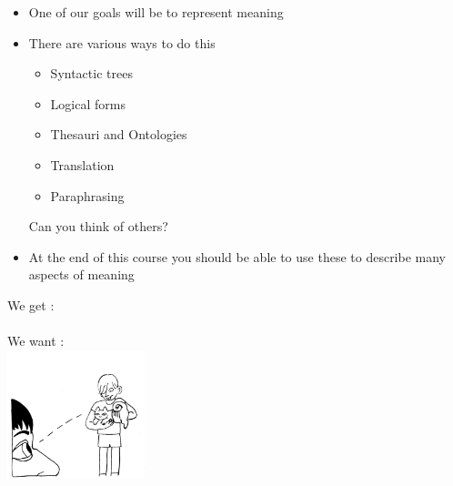\documentclass[a4paper,landscape,headrule,footrule,xetex,25pt]{foils}
\begin{document}
\begin{itemize}
\item One of our goals will be to represent meaning
\item There are various ways to do this
  \begin{itemize}
  \item Syntactic trees
  \item Logical forms
  \item Thesauri and Ontologies 
  \item Translation
  \item Paraphrasing
  \end{itemize}
Can you think of others?

\item At the end of this course you should be able to use these to
  describe many aspects of meaning
\end{itemize}



\begin{center}
\large We get : \\[2ex]
    \Large {} \\[3ex]
We want :
\\  \includegraphics[width=0.3\textwidth]{pics/1.png}
\end{center}
\end{document}
